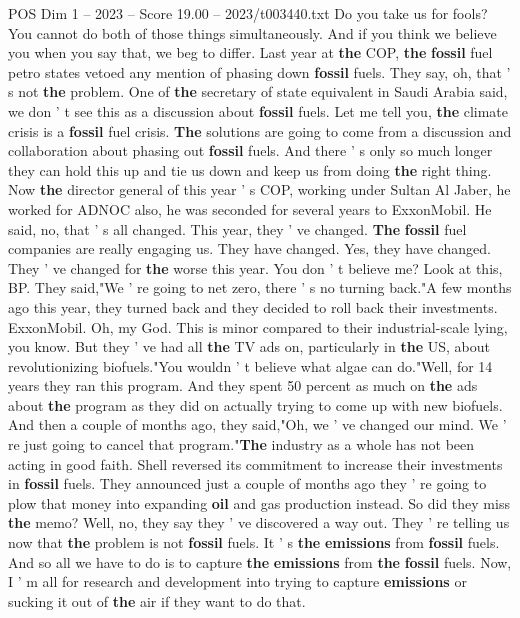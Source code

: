 \begin{textsample}{POS Dim 1 – 2023 – Score 19.00 – 2023/t003440.txt}
Do you take us for fools?
You cannot do both of those things simultaneously.
And if you think we believe you when you say that, we beg to differ.
Last year at \textbf{the} COP, \textbf{the} \textbf{fossil} fuel petro states vetoed any mention of phasing down \textbf{fossil} fuels.
They say, oh, that ' s not \textbf{the} problem.
One of \textbf{the} secretary of state equivalent in Saudi Arabia said, we don ' t see this as a discussion about \textbf{fossil} fuels.
Let me tell you, \textbf{the} climate crisis is a \textbf{fossil} fuel crisis. \textbf{The} solutions are going to come from a discussion and collaboration about phasing out \textbf{fossil} fuels.
And there ' s only so much longer they can hold this up and tie us down and keep us from doing \textbf{the} right thing.
Now \textbf{the} director general of this year ' s COP, working under Sultan Al Jaber, he worked for ADNOC also, he was seconded for several years to ExxonMobil.
He said, no, that ' s all changed.
This year, they ' ve changed. \textbf{The} \textbf{fossil} fuel companies are really engaging us.
They have changed.
Yes, they have changed.
They ' ve changed for \textbf{the} worse this year.
You don ' t believe me?
Look at this, BP.
They said,"We ' re going to net zero, there ' s no turning back."A few months ago this year, they turned back and they decided to roll back their investments.
ExxonMobil.
Oh, my God.
This is minor compared to their industrial-scale lying, you know.
But they ' ve had all \textbf{the} TV ads on, particularly in \textbf{the} US, about revolutionizing biofuels."You wouldn ' t believe what algae can do."Well, for 14 years they ran this program.
And they spent 50 percent as much on \textbf{the} ads about \textbf{the} program as they did on actually trying to come up with new biofuels.
And then a couple of months ago, they said,"Oh, we ' ve changed our mind.
We ' re just going to cancel that program."\textbf{The} industry as a whole has not been acting in good faith.
Shell reversed its commitment to increase their investments in \textbf{fossil} fuels.
They announced just a couple of months ago they ' re going to plow that money into expanding \textbf{oil} and gas production instead.
So did they miss \textbf{the} memo?
Well, no, they say they ' ve discovered a way out.
They ' re telling us now that \textbf{the} problem is not \textbf{fossil} fuels.
It ' s \textbf{the} \textbf{emissions} from \textbf{fossil} fuels.
And so all we have to do is to capture \textbf{the} \textbf{emissions} from \textbf{the} \textbf{fossil} fuels.
Now, I ' m all for research and development into trying to capture \textbf{emissions} or sucking it out of \textbf{the} air if they want to do that.

\end{textsample}
